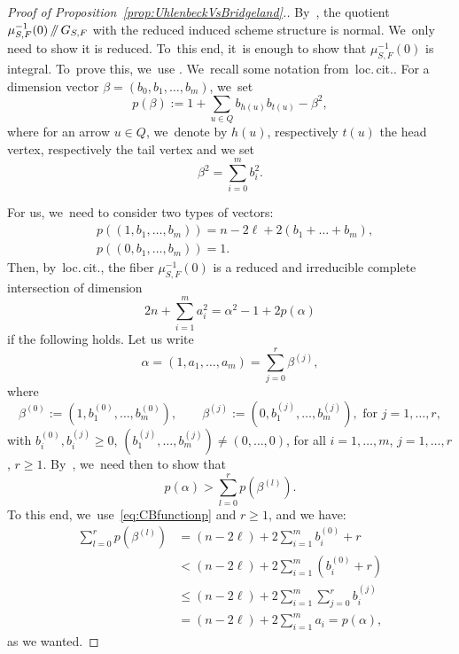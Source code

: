 \documentclass[JEP,XML,SOM,Unicode,published]{cedram}
\providecommand\sslash{\mathop{/\mkern-5.5mu/}}
\theoremstyle{definition}
\begin{document}
\begin{proof}[Proof of Proposition~\ref{prop:UhlenbeckVsBridgeland}.]
By~\cite[Th.\,1.1]{CB:normality}, the quotient $\mu^{-1}_{S,F}(0)\sslash G_{S,F}$ with the reduced induced scheme structure is normal. We~only need to show it is reduced. To~this end, it~is enough to show that $\mu^{-1}_{S,F}(0)$ is integral. To~prove this, we~use \cite{CB:geometry}. We~recall some notation from~loc.\,cit..
For a dimension vector $\beta=(b_0,b_1,\dots,b_m)$, we~set
\[
p(\beta):=1+\sum_{u\in Q} b_{h(u)}b_{t(u)} - \beta^2,
\]
where for an arrow $u\in Q$, we~denote by $h(u)$, respectively $t(u)$ the head vertex, respectively the tail vertex and we set
\[
\beta^2=\sum_{i=0}^m b_i^2.
\]

For us, we~need to consider two types of vectors:
\begin{equation}\label{eq:CBfunctionp}
\begin{split}
&p((1,b_1,\dots,b_m))=n-2\ell + 2(b_1+\dots+b_m),\\
&p((0,b_1,\dots,b_m))=1.
\end{split}
\end{equation}
Then, by~loc.\,cit., the fiber $\mu^{-1}_{S,F}(0)$ is a reduced and irreducible complete intersection of dimension
\[
2n+\sum_{i=1}^ma_i^2=\alpha^2-1+2p(\alpha)
\]
if the following holds.
Let us write
\[
\alpha=(1,a_1,\dots,a_m)=\sum_{j=0}^r \beta^{(j)},
\]
where
\[
\beta^{(0)}:=(1,b_1^{(0)},\dots,b_m^{(0)}),\qquad \beta^{(j)}:=(0,b_1^{(j)},\dots,b_m^{(j)}),\text{ for }j=1,\dots,r,
\]
with $b_i^{(0)},b_i^{(j)}\geq0$, $(b_1^{(j)},\dots,b_m^{(j)})\neq(0,\dots,0)$, for all $i=1,\dots,m$, $j=1,\dots,r$, $r\geq 1$.
By~\cite[Th.\,1.2(2)]{CB:geometry}, we~need then to show that
\[
p(\alpha)>\sum_{l=0}^rp(\beta^{(l)}).
\]
To this end, we~use~\eqref{eq:CBfunctionp} and $r\geq1$, and we have:
\[
\begin{split}
\sum_{l=0}^rp(\beta^{(l)}) & = (n-2\ell)+2\sum_{i=1}^m b_i^{(0)} + r \\
& < (n-2\ell)+2\sum_{i=1}^m (b_i^{(0)} + r) \\
& \leq (n-2\ell)+2\sum_{i=1}^m \sum_{j=0}^r b_i^{(j)}\\
& = (n-2\ell)+2\sum_{i=1}^m a_i = p(\alpha),
\end{split}
\]
as we wanted.
\end{proof}
\end{document}
